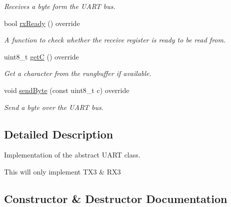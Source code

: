 \begin{DoxyCompactItemize}
\begin{DoxyCompactList}\small\item\em Receives a byte form the U\+A\+RT bus. \end{DoxyCompactList}\item 
\mbox{\label{classHardwareUart_adddb0832d3ada845701a8a5638a2140a}} 
bool \hyperlink{classHardwareUart_adddb0832d3ada845701a8a5638a2140a}{rx\+Ready} () override
\begin{DoxyCompactList}\small\item\em A function to check whether the receive register is ready to be read from. \end{DoxyCompactList}\item 
\mbox{\label{classHardwareUart_ab746480156eec92af197505681b9fcfc}} 
uint8\+\_\+t \hyperlink{classHardwareUart_ab746480156eec92af197505681b9fcfc}{getC} () override
\begin{DoxyCompactList}\small\item\em Get a character from the rungbuffer if available. \end{DoxyCompactList}\item 
\mbox{\label{classHardwareUart_ae097ce5f33053f11b8c76052b6a20ab6}} 
void \hyperlink{classHardwareUart_ae097ce5f33053f11b8c76052b6a20ab6}{send\+Byte} (const uint8\+\_\+t c) override
\begin{DoxyCompactList}\small\item\em Send a byte over the U\+A\+RT bus. \end{DoxyCompactList}\end{DoxyCompactItemize}


\subsection{Detailed Description}
Implementation of the abstract U\+A\+RT class. 

This will only implement T\+X3 \& R\+X3 

\subsection{Constructor \& Destructor Documentation}
\mbox{\label{classHardwareUart_aa5ca3cbeac085c36f9902a6933009615}} 
